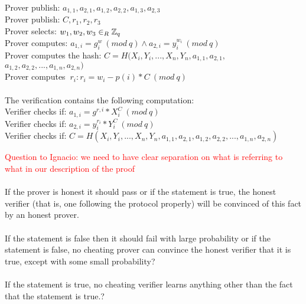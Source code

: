 \begin{infobox}
Prover publish:  $a_{1,1},a_{2,1},a_{1,2},a_{2,2},a_{1,3},a_{2,3}$ \\
Prover publish:                   $C,r_1,r_2,r_3$ \\
Prover selects:  $w_1, w_2,w_3\in_R \mathbb{Z}_q$ \\
Prover computes: $a_{1,i}=g^w_i \ (mod\ q) \land a_{2,i}=y_i^{w_i} \ (mod\ q)$ \\
Prover computes the hash:  $C=H(X_i,Y_i,...,X_n,Y_n,a_{1,1},a_{2,1},$\\
$a_{1,2},a_{2,2},...,a_{1,n},a_{2,n})$\\
Prover computes  $\ r_i:  r_i=w_i-p(i) * C \ (mod\ q)$ \\\\
The verification contains the following computation: \\
Verifier checks if: $a_{1,i} = g^{r,i}*X_i^C \ (mod\ q) $        \\
Verifier checks if: $a_{2,i} =y_i^{r_{i}} * Y_i^C \ (mod\ q)  $   \\
Verifier checks if: $C=H(X_i,Y_i,...,X_n,Y_n,a_{1,1},a_{2,1},a_{1,2},a_{2,2},...,a_{1,n},a_{2,n})$

\end{infobox}



\begin{infobox}
\textcolor{red}{Question to Ignacio: we need to have clear separation on what is referring to what in our description of the proof}\\\\
 If the prover is honest it should pass or if the statement is true, the honest verifier (that is, one following the protocol properly)
will be convinced of this fact by an honest prover.\\\\
If the statement is false then it should fail with large probability or if the statement is false, no cheating prover can convince
the honest verifier that it is true, except with some small probability?\\\\
 If the statement is true, no cheating verifier learns anything other than the fact that the statement is true.?
\end{infobox}

